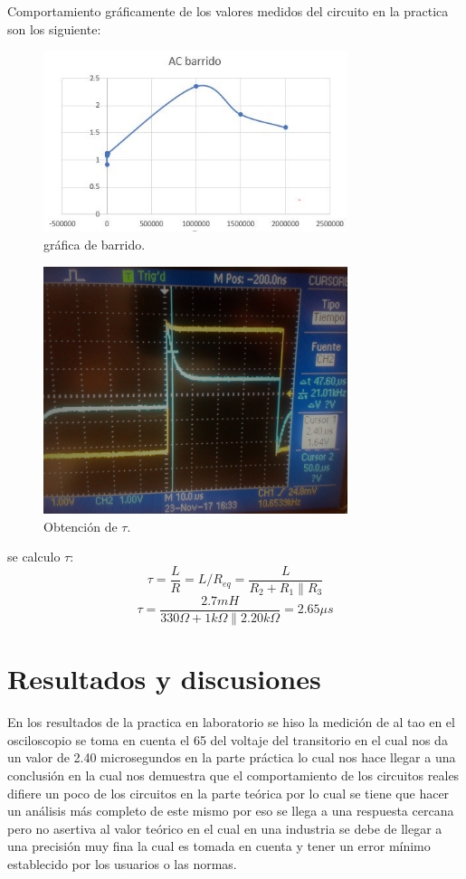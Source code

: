 \documentclass[12pt]{report}
\begin{document}
Comportamiento gráficamente de los valores medidos del circuito en la practica son los siguiente:\\
\begin{figure}[h!]
  \centering
    \includegraphics[width=3.5in]{barrido}
  \caption{gráfica de barrido.}
  \end{figure}
  \begin{figure}[h!]
  \centering
    \includegraphics[width=3.5in]{tran}
  \caption{Obtención de $\tau$.}
  \end{figure} 
se calculo $\tau$:
\begin{equation}
\tau =\frac{L}{R}=L/R_{eq}=\frac{L}{R_2 + R_1 \parallel R_3}
\end{equation}
\begin{equation}
\tau =\frac{2.7mH}{330 \Omega +1k \Omega \parallel 2.20k \Omega }=2.65 \mu s
\end{equation}
\chapter{Resultados y discusiones}
En los resultados de la practica en laboratorio se hiso la medición de al tao en el osciloscopio se toma en cuenta el 65 del voltaje del transitorio en el cual nos da un valor de 2.40 microsegundos en la parte práctica lo cual nos hace llegar a una conclusión en la cual nos demuestra que el comportamiento de los circuitos reales difiere un poco de los circuitos en la parte teórica por lo cual se tiene que hacer un análisis más completo de este mismo por eso se llega a una respuesta cercana pero no asertiva al valor teórico en el cual en una industria se debe de llegar a una precisión muy fina la cual es tomada en cuenta y tener un error mínimo establecido por los usuarios o las normas.
\end{document}
